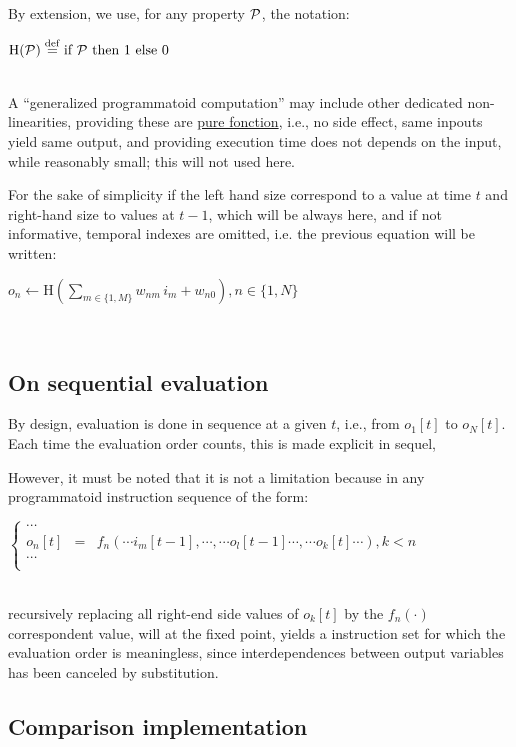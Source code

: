 \documentclass[a4]{article} \usepackage[left=2cm,right=3cm,top=1cm,bottom=2cm]{geometry}
\newcommand{\eqline}[1]{~\vspace{0.1cm}\\\centerline{$#1$}\vspace{0.1cm}\\}
\newcommand{\defq}{\stackrel {\rm def}{=}}
\begin{document}
By extension, we use,  for any property ${\cal P}$, the notation:
\eqline{\mbox{H}({\cal P}) \defq \mbox{if } {\cal P} \mbox{ then } 1 \mbox{ else } 0}

A ``generalized programmatoid computation'' may include other dedicated non-linearities, providing these are \href{https://en.wikipedia.org/wiki/Pure_function}{pure fonction}, i.e., no side effect, same inpouts yield same output, and providing execution time does not depends on the input, while reasonably small; this will not used here.

For the sake of simplicity if the left hand size correspond to a value at time $t$ and right-hand size to values at $t-1$, which will be always here, and if not informative, temporal indexes are omitted, i.e. the previous equation will be written: 
\eqline{o_n  \leftarrow \mbox{H}(\sum_{m\in\{1,M\}} w_{nm} \, i_m + w_{n0}), n \in \{1, N\}}

\subsection{On sequential evaluation}

By design, evaluation is done in sequence at a given $t$, i.e., from $o_1[t]$ to $o_N[t]$. Each time the evaluation order counts, this is made explicit in sequel,

However, it must be noted that it is not a limitation because in any programmatoid instruction sequence of the form:
\eqline{\left\{ \begin{array}{rcl} \cdots \\ o_n[t] &=& f_n\left(\cdots i_m[t-1], \cdots, \cdots o_l[t - 1]  \cdots, \cdots o_k[t]  \cdots  \right), k < n \\ \cdots \\ \end{array} \right.}
recursively replacing all right-end side values of $o_k[t]$ by the $ f_n\left(\cdot\right)$ correspondent value, will at the fixed point, yields a instruction set for which the evaluation order is meaningless, since interdependences between output variables has been canceled by substitution.

\subsection{Comparison implementation}
\end{document}
